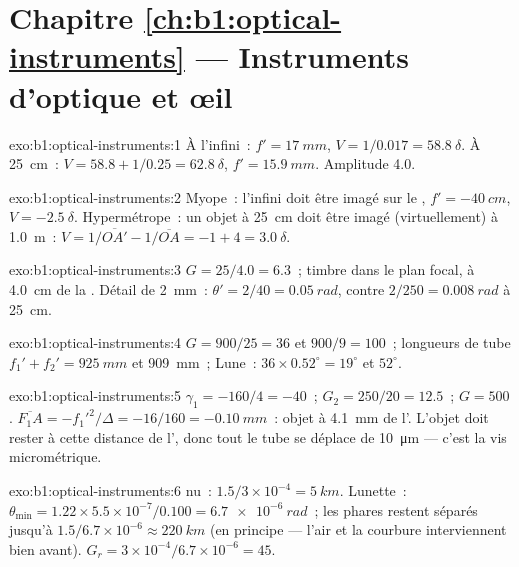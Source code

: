 \section*{Chapitre \ref{ch:b1:optical-instruments} --- Instruments d'optique et œil}

\begin{solution}{exo:b1:optical-instruments:1}
À l'infini~: $f' = \qty{17}{mm}$, $V = 1/0.017 = \qty{58.8}{\delta}$.
À \qty{25}{cm}~: $V = 58.8 + 1/0.25 = \qty{62.8}{\delta}$, $f' = \qty{15.9}{mm}$.
Amplitude \qty{4.0}{\delta}.
\end{solution}

\begin{solution}{exo:b1:optical-instruments:2}
Myope~: l'infini doit être imagé sur le , $f' = \qty{-40}{cm}$,
$V = \qty{-2.5}{\delta}$. Hypermétrope~: un objet à \qty{25}{cm} doit
être imagé (virtuellement) à \qty{1.0}{m}~: $V = 1/\overline{OA'} - 1/\overline{OA}
= -1 + 4 = \qty{+3.0}{\delta}$.
\end{solution}

\begin{solution}{exo:b1:optical-instruments:3}
$G = 25/4.0 = 6.3$~; timbre dans le plan focal, à \qty{4.0}{cm} de la
. Détail de \qty{2}{mm}~: $\theta' = 2/40 = \qty{0.05}{rad}$,
contre $2/250 = \qty{0.008}{rad}$ à \qty{25}{cm}.
\end{solution}

\begin{solution}{exo:b1:optical-instruments:4}
$G = 900/25 = 36$ et $900/9 = 100$~; longueurs de tube $f_1' + f_2' =
\qty{925}{mm}$ et \qty{909}{mm}~; Lune~: $36 \times 0.52^\circ = 19^\circ$
et $52^\circ$.
\end{solution}

\begin{solution}{exo:b1:optical-instruments:5}
$\gamma_1 = -160/4 = -40$~; $G_2 = 250/20 = 12.5$~; $G = 500$.
$\overline{F_1A} = -f_1'^2/\Delta = -16/160 = \qty{-0.10}{mm}$~: objet à
\qty{4.1}{mm} de l'. L'objet doit rester à cette distance de
l', donc tout le tube se déplace de \qty{10}{\micro m} --- c'est
la vis micrométrique.
\end{solution}

\begin{solution}{exo:b1:optical-instruments:6}
 nu~: $1.5/3\times10^{-4} = \qty{5}{km}$. Lunette~: $\theta_{\min}
= 1.22 \times 5.5\times10^{-7}/0.100 = \qty{6.7e-6}{rad}$~; les phares
restent séparés jusqu'à $1.5/6.7\times10^{-6} \approx \qty{220}{km}$ (en
principe --- l'air et la courbure interviennent bien avant). $G_r = 3\times10^{-4}/
6.7\times10^{-6} = 45$.
\end{solution}


